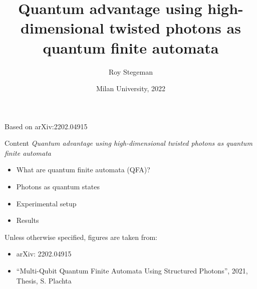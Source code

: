 \documentclass[aspectratio=169,9pt]{beamer}
\title{Quantum advantage using high-dimensional twisted photons as quantum finite automata}
\date{Milan University, 2022}
\author{Roy Stegeman}
\institute{University of Milan and INFN Milan}
\begin{document}
{
\begin{frame}
  \titlepage


  Based on arXiv:2202.04915

\end{frame}
}



\begin{frame}[t]{Content}
  \textit{Quantum advantage using high-dimensional twisted photons as quantum finite automata}
  \vspace*{1em}
  \begin{itemize}
    \item What are quantum finite automata (QFA)?
    \item Photons as quantum states
    \item Experimental setup
    \item Results
  \end{itemize}
  \vspace*{5em}
  Unless otherwise specified, figures are taken from:
  \begin{itemize}
    \item arXiv: 2202.04915
    \item ``Multi-Qubit Quantum Finite
    Automata Using Structured
    Photons'', 2021, Thesis, S. Plachta
  \end{itemize}
\end{frame}


\end{document}
